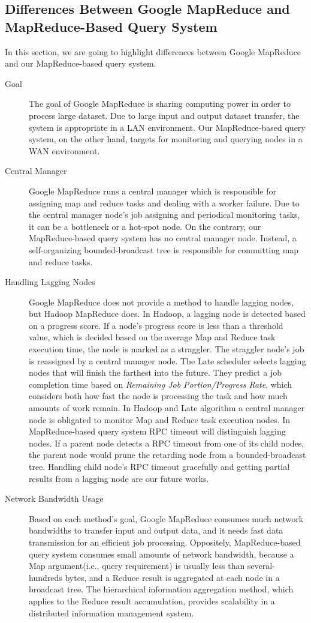 \documentclass{acm_proc_article-sp}
\begin{document}
\subsection{Differences Between Google MapReduce and MapReduce-Based Query System}
In this section, we are going to highlight differences between Google MapReduce and our MapReduce-based query system.
\begin{description}
\item[Goal]The goal of Google MapReduce is sharing computing power in order to process large dataset\cite{google_mapreduce}. Due to large input and output dataset transfer, the system is appropriate in a LAN environment.
Our MapReduce-based query system, on the other hand, targets for monitoring and querying nodes in a WAN environment.
\item[Central Manager]Google MapReduce runs a central manager which is responsible for assigning map and reduce tasks and dealing with a  worker failure.
Due to the central manager node's job assigning and periodical monitoring tasks, it can be a bottleneck or a hot-spot node. 
On the contrary, our MapReduce-based query system has no central manager node. Instead, a self-organizing bounded-broadcast tree is responsible for committing map and reduce tasks.
\item[Handling Lagging Nodes]Google MapReduce does not provide a method to handle lagging nodes, but Hadoop MapReduce does. In Hadoop, a lagging node is detected based on a progress score.
If a node's progress score is less than a threshold value, which is decided based on the average Map and Reduce task execution time, the node is marked as a straggler. The straggler node's job is reassigned by a central manager node\cite{hadoop}.
The Late scheduler\cite{late} selects lagging nodes that will finish the farthest into the future. They predict a job completion time based on \textit{Remaining Job Portion/Progress Rate}, which considers both
how fast the node is processing the task and how much amounts of work remain. 
In Hadoop and Late algorithm a central manager node is obligated to monitor Map and Reduce task execution nodes. 
In MapReduce-based query system RPC timeout will distinguish lagging nodes. If a parent node detects a RPC timeout from one of its child nodes, the parent node would prune the retarding node from a bounded-broadcast tree.
Handling child node's RPC timeout gracefully and getting partial results from a lagging node are our future works.
\item[Network Bandwidth Usage]Based on each method's goal, Google MapReduce consumes much network bandwidths to transfer input and output data, and it needs fast data transmission for an efficient job processing. 
Oppositely, MapReduce-based query system consumes small amounts of network bandwidth, because a Map argument(i.e., query requirement) is usually less than several-hundreds bytes, and a Reduce result is aggregated at each node in a broadcast tree.
The hierarchical information aggregation method, which applies to the Reduce result accumulation, provides scalability in a distributed information management system.\cite{astrobe}\cite{treedatamanage}
\end{description} 
\end{document}
